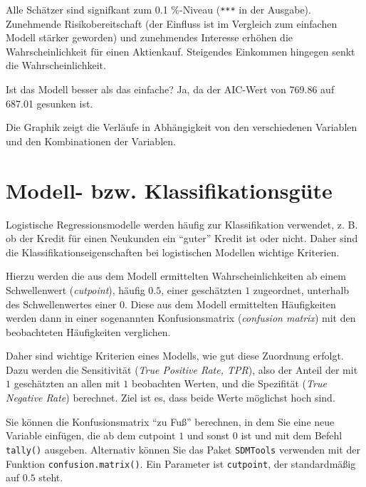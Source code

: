\documentclass[12pt,ngerman,]{book}
\begin{document}
Alle Schätzer sind signifkant zum 0.1 \%-Niveau (\texttt{***} in der
Ausgabe). Zunehmende Risikobereitschaft (der Einfluss ist im Vergleich
zum einfachen Modell stärker geworden) und zunehmendes Interesse erhöhen
die Wahrscheinlichkeit für einen Aktienkauf. Steigendes Einkommen
hingegen senkt die Wahrscheinlichkeit.

Ist das Modell besser als das einfache? Ja, da der AIC-Wert von 769.86
auf 687.01 gesunken ist.

Die Graphik zeigt die Verläufe in Abhängigkeit von den verschiedenen
Variablen und den Kombinationen der Variablen.

\section{Modell- bzw.
Klassifikationsgüte}\label{modell--bzw.-klassifikationsgute}

Logistische Regressionsmodelle werden häufig zur Klassifikation
verwendet, z. B. ob der Kredit für einen Neukunden ein ``guter'' Kredit
ist oder nicht. Daher sind die Klassifikationseigenschaften bei
logistischen Modellen wichtige Kriterien.

Hierzu werden die aus dem Modell ermittelten Wahrscheinlichkeiten ab
einem Schwellenwert (\emph{cutpoint}), häufig \(0.5\), einer geschätzten
\(1\) zugeordnet, unterhalb des Schwellenwertes einer \(0\). Diese aus
dem Modell ermittelten Häufigkeiten werden dann in einer sogenannten
Konfusionsmatrix (\emph{confusion matrix}) mit den beobachteten
Häufigkeiten verglichen.

Daher sind wichtige Kriterien eines Modells, wie gut diese Zuordnung
erfolgt. Dazu werden die Sensitivität (\emph{True Positive Rate, TPR}),
also der Anteil der mit \(1\) geschätzten an allen mit \(1\) beobachten
Werten, und die Spezifität (\emph{True Negative Rate}) berechnet. Ziel
ist es, dass beide Werte möglichst hoch sind.

Sie können die Konfusionsmatrix ``zu Fuß'' berechnen, in dem Sie eine
neue Variable einfügen, die ab dem cutpoint \(1\) und sonst \(0\) ist
und mit dem Befehl \texttt{tally()} ausgeben. Alternativ können Sie das
Paket \texttt{SDMTools} verwenden mit der Funktion
\texttt{confusion.matrix()}. Ein Parameter ist \texttt{cutpoint}, der
standardmäßig auf \(0.5\) steht.
\end{document}
